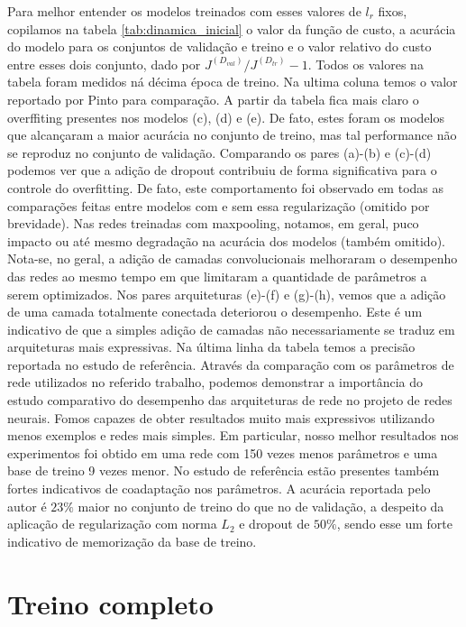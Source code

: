 Para melhor entender os modelos treinados com esses valores de $l_r$ fixos, copilamos na tabela \ref{tab:dinamica_inicial} o valor da função de custo, a acurácia do modelo para os conjuntos de validação e treino e o valor relativo do custo entre esses dois conjunto, dado por $J^{(D_{val})}/J^{(D_{tr})} - 1$. Todos os valores na tabela foram medidos ná décima época de treino. Na ultima coluna temos o valor reportado por Pinto para comparação. A partir da tabela fica mais claro o overffiting presentes nos modelos (c), (d) e (e). De fato, estes foram os modelos que alcançaram a maior acurácia no conjunto de treino, mas tal performance não se reproduz no conjunto de validação. Comparando os pares (a)-(b) e (c)-(d) podemos ver que a adição de dropout contribuiu de forma significativa para o controle do overfitting. De fato, este comportamento foi observado em todas as comparações feitas entre modelos com e sem essa regularização (omitido por brevidade). Nas redes treinadas com maxpooling, notamos, em geral, puco impacto ou até mesmo degradação na acurácia dos modelos (também omitido). Nota-se, no geral, a adição de camadas convolucionais melhoraram o desempenho das redes ao mesmo tempo em que limitaram a quantidade de parâmetros a serem optimizados. Nos pares arquiteturas (e)-(f) e (g)-(h), vemos que a adição de uma camada totalmente conectada deteriorou o desempenho. Este é um indicativo de que a simples adição de camadas não necessariamente se traduz em arquiteturas mais expressivas. Na última linha da tabela temos a precisão reportada no estudo de referência. Através da comparação com os parâmetros de rede utilizados no referido trabalho, podemos demonstrar a importância do estudo comparativo do desempenho das arquiteturas de rede no projeto de redes neurais. Fomos capazes de obter resultados muito mais expressivos utilizando menos exemplos e redes mais simples. Em particular, nosso melhor resultados nos experimentos foi obtido em uma rede com 150 vezes menos parâmetros e uma base de treino 9 vezes menor. No estudo de referência estão presentes também fortes indicativos de coadaptação nos parâmetros. A acurácia reportada pelo autor é $23\%$ maior no conjunto de treino do que no de  validação, a despeito da aplicação de regularização com norma $L_2$ e dropout de $50\%$, sendo esse um forte indicativo de memorização da base de treino.

\section{Treino completo}

